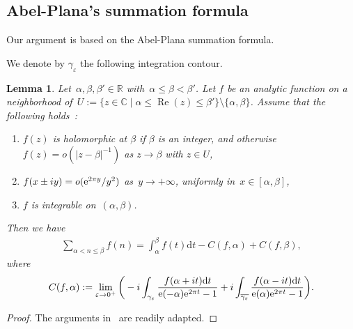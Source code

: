 \documentclass[11pt]{amsart}
\newcommand{\eps}{\varepsilon}
\newcommand{\R}{\mathbb{R}}
\newcommand{\C}{\mathbb{C}}
\newtheorem{lemma}{Lemma}
\theoremstyle{definition}
\newcommand{\pr}[1]{\mathchoice{\left( #1\right)}{(#1)}{(#1)}{(#1)}}
\newcommand{\e}[1][]{\ifthenelse{\equal{#1}{}}{{\rm e}}{\operatorname{e}\pr{ #1}}}
\newcommand{\df}{\mathrm{d}}
\renewcommand\Re{\operatorname{Re}}
\newcommand{\1}{{\mathbf 1}}
\let\originalleft\left
\let\originalright\right
\renewcommand{\left}{\mathopen{}\mathclose\bgroup\originalleft}
\renewcommand{\right}{\aftergroup\egroup\originalright}
\numberwithin{equation}{section}
\begin{document}
\subsection{Abel-Plana's summation formula}

Our argument is based on the Abel-Plana summation formula.

We denote by $\gamma_\eps$ the following integration contour. 
\begin{figure}[H]\label{fig:contour}
  \centering
\end{figure}

\begin{lemma}\label{lem:abelplana}
  Let~$\alpha, \beta,\beta'\in\R$ with~$\alpha \leq \beta<\beta'$. Let $f$ be an analytic function on a neighborhood of~$U:=\{z\in\C \mid \alpha\leq \Re(z)\leq \beta'\}\setminus\{\alpha,\beta\}$. Assume that the following holds~:
  \begin{enumerate}
  \item $f(z)$ is holomorphic at $\beta$ if $\beta$ is an integer, and otherwise $f(z)=o(|z-\beta|^{-1})$ as $z\to\beta$ with $z\in U$,
  \item $f(x\pm iy) = o(\e^{2\pi y}/y^2)$ as~$y\to+\infty$, uniformly in~$x\in[\alpha, \beta]$,
  \item $f$ is integrable on~$(\alpha, \beta)$.
  \end{enumerate}
  Then we have
  \begin{align}\label{eq:abelplana}
    \sum_{\alpha < n \leq \beta} f(n) = \int_{\alpha}^{\beta} f(t)\df t - C(f, \alpha) + C(f, \beta), 
  \end{align}
  where 
  $$
  C(f, \alpha):=\lim_{\eps\to0^+}\bigg(- i \int_{\gamma_\eps}  \frac{f(\alpha + it)\df{t}}{\e[-\alpha]\e^{2\pi t}-1}+ i \int_{\overline{\gamma_\eps}}  \frac{f(\alpha - it)\df{t}}{\e[\alpha]\e^{2\pi t}-1}\bigg). $$
\end{lemma}
\begin{proof}
The arguments in~\cite[Chapter~8, eq. (3.01)]{Olver1997} are readily adapted.
\end{proof}
\end{document}
